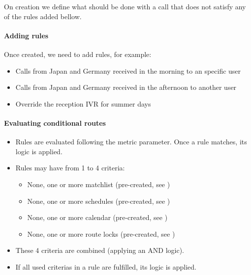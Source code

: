 \documentclass[letterpaper,10pt,spanish]{sphinxmanual}
\begin{document}
On creation we define what should be done with a call that does not satisfy any
of the rules added bellow.


\paragraph{Adding rules}
\label{administration_portal/client/vpbx/routing_endpoints/conditional_routes:adding-rules}
Once created, we need to add rules, for example:
\begin{itemize}
\item {} 
Calls from Japan and Germany received in the morning to an specific user

\item {} 
Calls from Japan and Germany received in the afternoon to another user

\item {} 
Override the reception IVR for summer days

\end{itemize}


\paragraph{Evaluating conditional routes}
\label{administration_portal/client/vpbx/routing_endpoints/conditional_routes:evaluating-conditional-routes}\begin{itemize}
\item {} 
Rules are evaluated following the metric parameter. Once a rule matches, its
logic is applied.

\item {} 
Rules may have from 1 to 4 criteria:
\begin{itemize}
\item {} 
None, one or more matchlist (pre-created, see {\hyperref[administration_portal/client/vpbx/routing_tools/match_lists:match\string-lists]{}})

\item {} 
None, one or more schedules (pre-created, see {\hyperref[administration_portal/client/vpbx/routing_tools/schedules:schedules]{}})

\item {} 
None, one or more calendar (pre-created, see {\hyperref[administration_portal/client/vpbx/routing_tools/calendars:calendars]{}})

\item {} 
None, one or more route locks (pre-created, see {\hyperref[administration_portal/client/vpbx/routing_tools/route_locks:route\string-locks]{}})

\end{itemize}

\item {} 
These 4 criteria are combined (applying an AND logic).

\item {} 
If all used criterias in a rule are fulfilled, its logic is applied.

\end{itemize}
\end{document}
